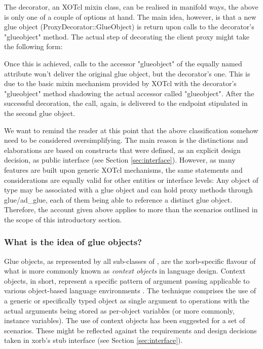 

The decorator, an XOTcl mixin class, can be realised in manifold ways, the above is only one of a couple of options at hand. The main idea, however, is that a new glue object (ProxyDecorator::GlueObject) is return upon calls to the decorator's "glueobject" method. The actual step of decorating the client proxy might take the following form:



Once this is achieved, calls to the accessor "glueobject" of the equally named attribute won't deliver the original glue object, but the decorator's one. This is due to the basic mixin mechanism provided by XOTcl with the decorator's "glueobject" method shadowing the actual accessor called "glueobject". 
After the successful decoration, the call, again, is delivered to the endpoint stipulated in the second glue object.

We want to remind the reader at this point that the above classification somehow need to be considered oversimplifying. The main reason is the distinctions and elaborations are based on constructs that were defined, as an explicit design decision, as public interface (see Section \ref{sec:interface}). However,  as many features are built upon generic XOTcl mechanisms, the same statements and considerations are equally valid for other entities or interface levels: Any object of type  may be associated with a glue object and can hold proxy methods through glue/ad\_glue, each of them being able to reference a distinct glue object. Therefore, the account given above applies to more than the scenarios outlined in the scope of this introductory section.
  \subsubsection{What is the idea of glue objects?}\label{sec:advanced:xorb:gobjects:what}
  Glue objects, as represented by all sub-classes of , are the xorb-specific flavour of what is more commonly known as \emph{context objects} in language design. Context objects, in short, represent a specific pattern of argument passing applicable to various object-based language environments \cite{zdun:2005b}. The technique comprises the use of a generic or specifically typed object as single argument to operations with the actual arguments being stored as per-object variables (or more commonly, instance variables). The use of context objects has been suggested for a set of scenarios. These might be reflected against the requirements and design decisions taken in xorb's stub interface (see Section \ref{sec:interface}).
  
